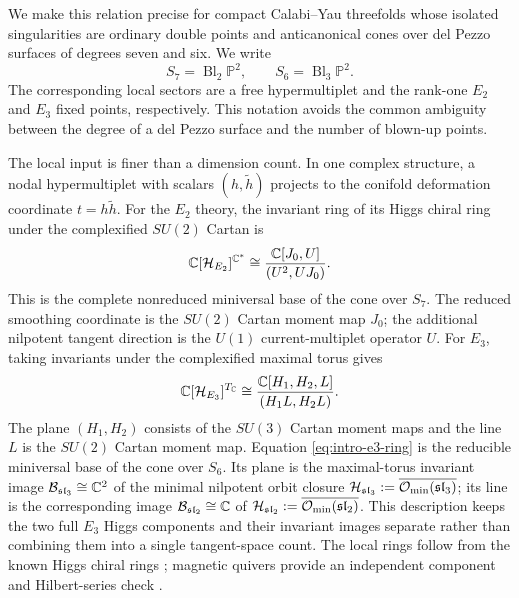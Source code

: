 We make this relation precise for compact Calabi--Yau threefolds whose isolated
singularities are ordinary double points and anticanonical cones over del
Pezzo surfaces of degrees seven and six. We write
\begin{equation}
 S_7=\operatorname{Bl}_2\mathbb P^2,
 \qquad
 S_6=\operatorname{Bl}_3\mathbb P^2 .
 \label{eq:intro-del-pezzo}
\end{equation}
The corresponding local sectors are a free hypermultiplet and the rank-one
$E_2$ and $E_3$ fixed points, respectively. This notation avoids the common
ambiguity between the degree of a del Pezzo surface and the number of blown-up
points.

The local input is finer than a dimension count. In one complex structure, a
nodal hypermultiplet with scalars $(h,\widetilde h)$ projects to the conifold
deformation coordinate $t=h\widetilde h$. For the $E_2$ theory, the invariant
ring of its Higgs chiral ring under the complexified $SU(2)$ Cartan is
\begin{equation}
 \mathbb C[\mathcal H_{E_2}]^{\mathbb C^*}
 \cong \frac{\mathbb C[J_0,U]}{(U^2,UJ_0)} .
 \label{eq:intro-e2-ring}
\end{equation}
This is the complete nonreduced miniversal base of the cone over $S_7$.
The reduced smoothing coordinate is the $SU(2)$ Cartan moment map $J_0$; the
additional nilpotent tangent direction is the $U(1)$ current-multiplet
operator $U$. For
$E_3$, taking invariants under the complexified maximal torus gives
\begin{equation}
 \mathbb C[\mathcal H_{E_3}]^{T_{\mathbb C}}
 \cong
 \frac{\mathbb C[H_1,H_2,L]}{(H_1L,H_2L)} .
 \label{eq:intro-e3-ring}
\end{equation}
The plane $(H_1,H_2)$ consists of the $SU(3)$ Cartan moment maps and the line
$L$ is the $SU(2)$ Cartan moment map. Equation
\eqref{eq:intro-e3-ring} is the reducible miniversal base of the cone over
$S_6$. Its plane is the maximal-torus invariant image
$\mathcal B_{\mathfrak{sl}_3}\cong\mathbb C^2$ of the minimal nilpotent orbit closure
$\mathcal H_{\mathfrak{sl}_3}:=\overline{\mathcal O_{\min}(\mathfrak{sl}_3)}$;
its line is the corresponding image $\mathcal B_{\mathfrak{sl}_2}\cong\mathbb C$ of
$\mathcal H_{\mathfrak{sl}_2}:=\overline{\mathcal O_{\min}(\mathfrak{sl}_2)}$.
This description keeps the two full $E_3$ Higgs components and their
invariant images separate rather than combining them into a single
tangent-space count. The local rings follow from
the known Higgs chiral rings
\cite{Cremonesi:2015lsa}; magnetic quivers provide an independent component
and Hilbert-series check \cite{Ferlito:2016,Cabrera:2018,Closset:2020afy}.

